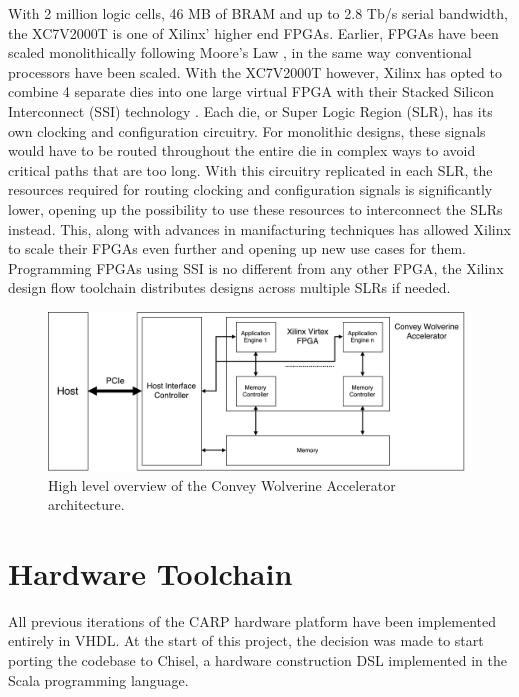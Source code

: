 With 2 million logic cells, 46 MB of BRAM and up to 2.8 Tb/s serial bandwidth,
the XC7V2000T is one of Xilinx' higher end FPGAs. Earlier, FPGAs have been
scaled monolithically following Moore's Law , in the same way
conventional processors have been scaled. With the XC7V2000T however, Xilinx has
opted to combine 4 separate dies into one large virtual FPGA with their Stacked
Silicon Interconnect (SSI) technology \cite{Saban2011}. Each die, or Super Logic
Region (SLR), has its own clocking and configuration circuitry. For monolithic
designs, these signals would have to be routed throughout the entire die in
complex ways to avoid critical paths that are too long. With this circuitry
replicated in each SLR, the resources required for routing clocking and
configuration signals is significantly lower, opening up the possibility to use
these resources to interconnect the SLRs instead. This, along with advances in
manifacturing techniques has allowed Xilinx to scale their FPGAs even further
and opening up new use cases for them. Programming FPGAs using SSI is no
different from any other FPGA, the Xilinx design flow toolchain distributes
designs across multiple SLRs if needed.


\begin{figure}[ht]
  \centering
  \includegraphics[width=\linewidth]{fig/convey-wx-card}
  \caption{
    High level overview of the Convey Wolverine Accelerator architecture.
    \label{fig:convey-wx-card}
  }
\end{figure}


\section{Hardware Toolchain}
\label{sec:hw-toolchain}

All previous iterations of the CARP hardware platform have been implemented
entirely in VHDL. At the start of this project, the decision was made to start
porting the codebase to Chisel, a hardware construction DSL implemented in the
Scala programming language.

